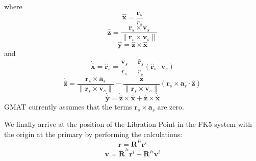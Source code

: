 %
where
%
\begin{equation}
     \hat{\mathbf{x}} = \frac{\mathbf{r}_s}{r_s}
\end{equation}
%
\begin{equation}
     \hat{\mathbf{z}} = \frac{\mathbf{r}_s\times\mathbf{v}_s}{\| \mathbf{r}_s\times\mathbf{v}_s \|}
\end{equation}
%
\begin{equation}
     \hat{\mathbf{y}} = \hat{\mathbf{z}} \times \hat{\mathbf{x}}
\end{equation}
%
and
\begin{equation}
    \dot{\hat{\mathbf{x}}} = \dot{\hat{\mathbf{r}}}_s  = \frac{\mathbf{v}_s}{r_s}  -
     \frac{\hat{\mathbf{r}}_s}{r_s}
     \left(\hat{\mathbf{r}}_s \cdot
     \mathbf{v}_s \right)
\end{equation}
%
\begin{equation}
     \dot{\hat{\mathbf{z}}} =\frac{\mathbf{r}_s \times \mathbf{a}_s}{\| \mathbf{r}_s\times\mathbf{v}_s \|} - \frac{\hat{\mathbf{z}}}{\| \mathbf{r}_s\times\mathbf{v}_s \|}
      \left(  \mathbf{r}_s\times\mathbf{a}_s \cdot \hat{\mathbf{z}} \right)
\end{equation}
%
\begin{equation}
     \dot{\hat{\mathbf{y}}} = \dot{\hat{\mathbf{z}}} \times
     \hat{\mathbf{x}} +\hat{\mathbf{z}} \times
     \dot{\hat{\mathbf{x}}}
\end{equation}
%
GMAT currently assumes that the terms $\mathbf{r}_s \times
\mathbf{a}_s$ are zero.


 We finally arrive at the position of
the Libration Point in the FK5 system with the origin at the primary
by performing the calculations:
%
\begin{equation}
   \mathbf{r} = \mathbf{R}^{Ii}\mathbf{r}^i
\end{equation}
%
\begin{equation}
   \mathbf{v} = \dot{\mathbf{R}}^{Ii}\mathbf{r}^i + \mathbf{R}^{Ii}\mathbf{v}^i
\end{equation}
%
